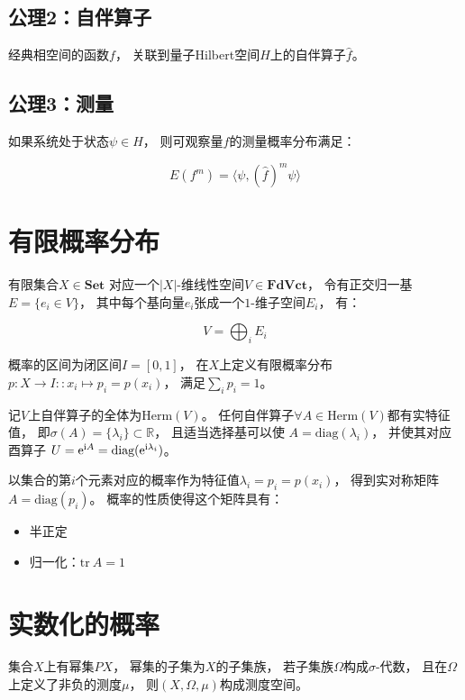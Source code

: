 \documentclass[10pt, openany]{book}
\begin{document}
\section{公理2：自伴算子}

经典相空间的函数$f$，
关联到量子Hilbert空间$H$上的自伴算子$\hat f$。

\section{公理3：测量}

如果系统处于状态$\psi \in H$，
则可观察量$f$的测量概率分布满足：

$$
E(f^m) = \langle \psi,(\hat f)^m\psi \rangle
$$


\chapter{有限概率分布}

有限集合$X\in\textbf{Set}$
对应一个$|X|$-维线性空间$V\in\textbf{FdVct}$，
令有正交归一基$E = \{e_i \in V\}$，
其中每个基向量$e_i$张成一个$1$-维子空间$E_i$，
有：

$$
V = \bigoplus_i E_i
$$

概率的区间为闭区间$I = [0,1]$，
在$X$上定义有限概率分布
$p: X \to I :: x_i \mapsto p_i = p(x_i)$，
满足$\sum_i p_i = 1$。

记$V$上自伴算子的全体为$\text{Herm}(V)$。
任何自伴算子$\forall A\in\text{Herm}(V)$都有实特征值，
即$\sigma(A) = \{ \lambda_i \} \subset \mathbb R$，
且适当选择基可以使
$A = \text{diag}(\lambda_i)$，
并使其对应酉算子
$U = \text e^{\text i A} = \text{diag}(\text e^{\text i \lambda_i})$。

以集合的第$i$个元素对应的概率作为特征值$\lambda_i = p_i = p(x_i)$，
得到实对称矩阵
$A = \text{diag}(p_i)$。
概率的性质使得这个矩阵具有：

\begin{itemize}
  \item 半正定
  \item 归一化：$\text{tr} \ A = 1$
\end{itemize}

\chapter{实数化的概率}

集合$X$上有幂集$PX$，
幂集的子集为$X$的子集族，
若子集族$\Omega$构成$\sigma$-代数，
且在$\Omega$上定义了非负的测度$\mu$，
则$(X,\Omega,\mu)$构成测度空间。
\end{document}
